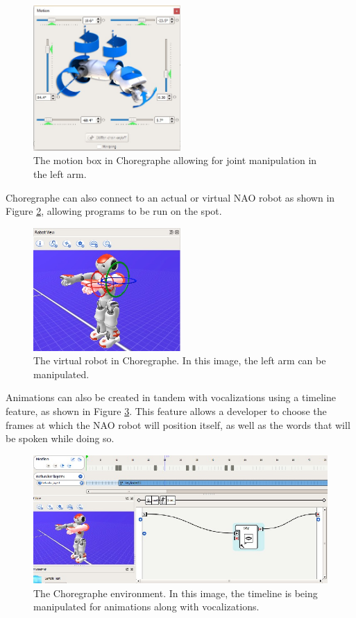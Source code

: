 \documentclass[onecolumn, draftclsnofoot,10pt, compsoc]{IEEEtran}
\begin{document}
\begin{figure}[H]
	\centering
	\includegraphics[width=0.5\textwidth]{choregraphe-movement}
	\caption{The motion box in Choregraphe allowing for joint manipulation in the left arm.}
	\label{fig:choregraphe-movement}
\end{figure}

Choregraphe can also connect to an actual or virtual NAO robot as shown in Figure \ref{fig:choregraphe-robot}, allowing programs to be run on the spot.

\begin{figure}[H]
	\centering
	\includegraphics[width=0.5\textwidth]{choregraphe-robot}
	\caption{The virtual robot in Choregraphe. In this image, the left arm can be manipulated.}
	\label{fig:choregraphe-robot}
\end{figure}

Animations can also be created in tandem with vocalizations using a timeline feature, as shown in Figure \ref{fig:choregraphe-timeline}. This feature allows a developer to choose the frames at which the NAO robot will position itself, as well as the words that will be spoken while doing so. \cite{NAOSDK:Choregraphe}

\begin{figure}[H]
	\centering
	\includegraphics{choregraphe-timeline}
	\caption{The Choregraphe environment. In this image, the timeline is being manipulated for animations along with vocalizations.}
	\label{fig:choregraphe-timeline}
\end{figure}
\end{document}
